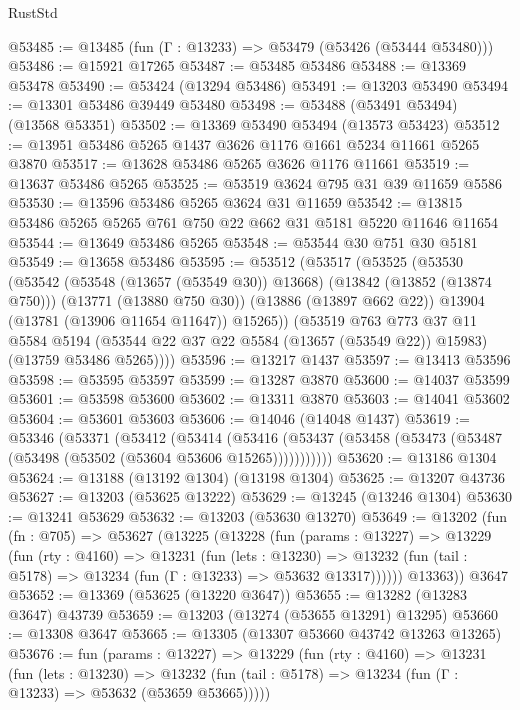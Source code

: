 \begin{lexlean}{RustStd}
\begin{coremodule}
@53485 := @13485 (fun (Γ : @13233) => @53479 (@53426 (@53444 @53480)))
@53486 := @15921 @17265
@53487 := @53485 @53486
@53488 := @13369 @53478
@53490 := @53424 (@13294 @53486)
@53491 := @13203 @53490
@53494 := @13301 @53486 @39449 @53480
@53498 := @53488 (@53491 @53494) (@13568 @53351)
@53502 := @13369 @53490 @53494 (@13573 @53423)
@53512 := @13951 @53486 @5265 @1437 @3626 @1176 @1661 @5234 @11661 @5265 @3870
@53517 := @13628 @53486 @5265 @3626 @1176 @11661
@53519 := @13637 @53486 @5265
@53525 := @53519 @3624 @795 @31 @39 @11659 @5586
@53530 := @13596 @53486 @5265 @3624 @31 @11659
@53542 := @13815 @53486 @5265 @5265 @761 @750 @22 @662 @31 @5181 @5220 @11646 @11654
@53544 := @13649 @53486 @5265
@53548 := @53544 @30 @751 @30 @5181
@53549 := @13658 @53486
@53595 := @53512
    (@53517
      (@53525
        (@53530
          (@53542
            (@53548 (@13657 (@53549 @30)) @13668)
            (@13842 (@13852 (@13874 @750)))
            (@13771 (@13880 @750 @30))
            (@13886 (@13897 @662 @22))
            @13904
            (@13781 (@13906 @11654 @11647))
            @15265))
        (@53519
          @763
          @773
          @37
          @11
          @5584
          @5194
          (@53544 @22 @37 @22 @5584 (@13657 (@53549 @22)) @15983)
          (@13759 @53486 @5265))))
@53596 := @13217 @1437
@53597 := @13413 @53596
@53598 := @53595 @53597
@53599 := @13287 @3870
@53600 := @14037 @53599
@53601 := @53598 @53600
@53602 := @13311 @3870
@53603 := @14041 @53602
@53604 := @53601 @53603
@53606 := @14046 (@14048 @1437)
@53619 := @53346
    (@53371
      (@53412
        (@53414
          (@53416 (@53437 (@53458 (@53473 (@53487 (@53498 (@53502 (@53604 @53606 @15265)))))))))))
@53620 := @13186 @1304
@53624 := @13188 (@13192 @1304) (@13198 @1304)
@53625 := @13207 @43736
@53627 := @13203 (@53625 @13222)
@53629 := @13245 (@13246 @1304)
@53630 := @13241 @53629
@53632 := @13203 (@53630 @13270)
@53649 := @13202
    (fun (fn : @705) =>
    @53627
      (@13225
        (@13228
          (fun (params : @13227) =>
          @13229
            (fun (rty : @4160) =>
            @13231
              (fun (lets : @13230) =>
              @13232 (fun (tail : @5178) => @13234 (fun (Γ : @13233) => @53632 @13317))))))
        @13363))
    @3647
@53652 := @13369 (@53625 (@13220 @3647))
@53655 := @13282 (@13283 @3647) @43739
@53659 := @13203 (@13274 (@53655 @13291) @13295)
@53660 := @13308 @3647
@53665 := @13305 (@13307 @53660 @43742 @13263 @13265)
@53676 := fun (params : @13227) =>
  @13229
    (fun (rty : @4160) =>
    @13231
      (fun (lets : @13230) =>
      @13232 (fun (tail : @5178) => @13234 (fun (Γ : @13233) => @53632 (@53659 @53665)))))

\end{coremodule}
\end{lexlean}
